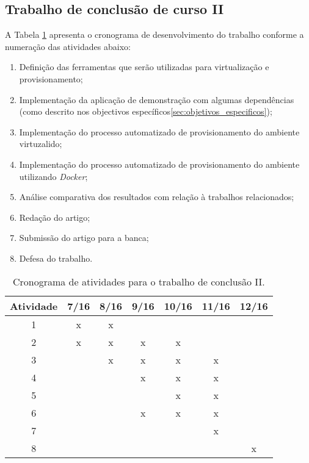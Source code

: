 \documentclass[11pt,a4paper]{article}
\begin{document}
\subsection{Trabalho de conclusão de curso II}

A Tabela \ref{tab:cronograma2} apresenta o cronograma de desenvolvimento do trabalho conforme a numeração das atividades abaixo:
\begin{enumerate}
  \item Definição das ferramentas que serão utilizadas para virtualização e provisionamento;
  \item Implementação da aplicação de demonstração com algumas dependências (como descrito nos objectivos
    específicos\ref{sec:objetivos_especificos});
  \item Implementação do processo automatizado de provisionamento do ambiente virtuzalido;
  \item Implementação do processo automatizado de provisionamento do ambiente utilizando \textit{Docker};
  \item Análise comparativa dos resultados com relação à trabalhos relacionados;
  \item Redação do artigo;
  \item Submissão do artigo para a banca;
  \item Defesa do trabalho.
\end{enumerate}

\begin{table}[h]
  \begin{center}
    \caption{Cronograma de atividades para o trabalho de conclusão II. \label{tab:cronograma2}}
    \begin{tabular}{|c|c|c|c|c|c|c|}
      \hline
      \bf Atividade & \bf 7/16 & \bf 8/16 & \bf 9/16 & \bf 10/16 & \bf 11/16 & \bf 12/16  \\  \hline \hline
      1 & x & x &   &   &   &   \\ \hline
      2 & x & x & x & x &   &   \\ \hline
      3 &   & x & x & x & x &   \\ \hline
      4 &   &   & x & x & x &   \\ \hline
      5 &   &   &   & x & x &   \\ \hline
      6 &   &   & x & x & x &   \\ \hline
      7 &   &   &   &   & x &   \\ \hline
      8 &   &   &   &   &   & x \\ \hline
    \end{tabular}
  \end{center}
\end{table}

\renewcommand\refname{Referências}
{\small
  
  
}
\end{document}
